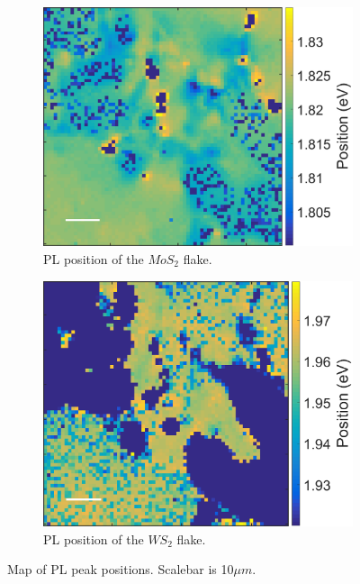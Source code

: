 \begin{figure}[H]
	\begin{center}
		\begin{subfigure}[b]{0.5\textwidth}
			\includegraphics[scale=0.25]{Heterostructures/PLPositionMap21.png}
			\caption{PL position of the $MoS_2$ flake.}
			\label{fig:HeterostructuresPLPosition21Map}
		\end{subfigure}
		\begin{subfigure}[b]{0.45\textwidth}
			\includegraphics[scale=0.25]{Heterostructures/PLPositionMap22.png}
		\caption{PL position of the $WS_2$ flake.}
		\label{fig:HeterostructuresPLPosition22Map}
		\end{subfigure}
		\caption{Map of PL peak positions. Scalebar is 10$\mu m$.}
		\label{fig:HeterostructuresPLPositionsMap}
	\end{center}
\end{figure}

